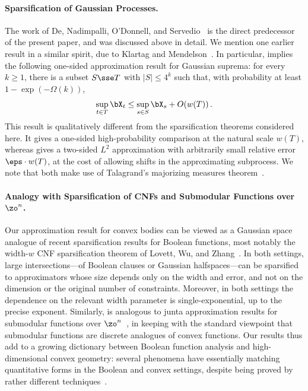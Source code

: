 \documentclass[11pt]{article}
\begin{document}
\paragraph{Sparsification of Gaussian Processes.} 

The work of De, Nadimpalli, O'Donnell, and Servedio~\cite{de2026sparsifying} is the direct predecessor of the present paper, and was discussed above in detail. 
We mention one earlier result in a similar spirit, due to Klartag and Mendelson~\cite{klartag2005empirical}. 
In particular, \cite[Lemma~2.3]{klartag2005empirical} implies the following one-sided approximation result for Gaussian suprema: for every $k\geq 1$, there is a subset $S\sse T$ with $|S|\leq 4^k$ such that, with probability at least $1-\exp(-\Omega(k))$,
\[
	\sup_{t\in T}\bX_t
	\leq
	\sup_{s\in S}\bX_s + O(w(T))\,.
\]
This result is qualitatively different from the sparsification theorems considered here. 
It gives a one-sided high-probability comparison at the natural scale $w(T)$, whereas  gives a two-sided $L^2$ approximation with arbitrarily small relative error $\eps\cdot w(T)$, at the cost of allowing shifts in the approximating subprocess. 
We note that both \cite{klartag2005empirical,de2026sparsifying} make use of Talagrand's majorizing measures theorem~\cite[Theorem~2.10.1]{talagrand2022upper}. 

\paragraph{Analogy with Sparsification of CNFs and Submodular Functions over $\zo^n$.} 

Our approximation result for convex bodies can be viewed as a Gaussian space analogue of recent sparsification results for Boolean functions, most notably the width-$w$ CNF sparsification theorem of Lovett, Wu, and Zhang~\cite{lovett2021decision}.  
In both settings, large intersections---of Boolean clauses or Gaussian halfspaces---can be sparsified to approximators whose size depends only on the width and error, and not on the dimension or the original number of constraints. 
Moreover, in both settings the dependence on the relevant width parameter is single-exponential, up to the precise exponent.  
Similarly,  is analogous to junta approximation results for submodular functions over $\zo^n$~\cite{FKV13,FV16}, in keeping with the standard viewpoint that submodular functions are discrete analogues of convex functions. 
Our results thus add to a growing dictionary between Boolean function analysis and high-dimensional convex geometry: several phenomena have essentially matching quantitative forms in the Boolean and convex settings, despite being proved by rather different techniques~\cite{DNS21itcs,DNS22,DNS23-polytope}. 
\end{document}
